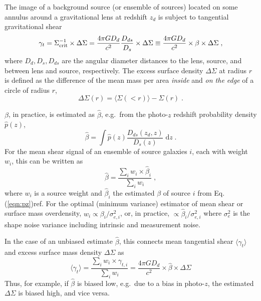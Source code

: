 {The image of a background source (or ensemble of sources) located on some annulus around a gravitational lens at redshift $z_d$ is subject to tangential gravitational shear \citep[e.g.][for a review]{2001PhR...340..291B}
\begin{equation}
\gamma_t=\Sigma_{\rm crit}^{-1}\times\Delta\Sigma=\frac{4\pi G D_{d}}{c^2}\frac{D_{ds}}{D_s}\times\Delta\Sigma\equiv \frac{4\pi G D_{d}}{c^2}\times\beta\times\Delta\Sigma \; ,
\end{equation}
where $D_d, D_s, D_{ds}$ are the angular diameter distances to the lens, source, and between lens and source, respectively. The excess surface density $\Delta\Sigma$ at radius $r$ is defined as the difference of the mean mass per area \emph{inside} and \emph{on the edge} of a circle of radius $r$,
\begin{equation}
\Delta\Sigma(r)=\langle\Sigma(<r)\rangle-\Sigma(r) \; .
\end{equation}

$\beta$, in practice, is estimated as $\hat{\beta}$, e.g.~from the photo-$z$ redshift probability density $\hat{p}(z)$,
\begin{equation}
\hat{\beta}=\int\hat{p}(z) \frac{D_{ds}(z_d,z)}{D_s(z)}\; \mathrm{d}z \; .
\label{eqn:pz}
\end{equation}
For the mean shear signal of an ensemble of source galaxies $i$, each with weight $w_i$, this can be written as
\begin{equation}
\hat{\beta}=\frac{\sum_i w_i\times\hat{\beta}_i}{\sum_i w_i} \; ,
\label{eqn:nz}
\end{equation}
where $w_i$ is a source weight and $\hat{\beta}_i$ the estimated $\beta$ of source $i$ from Eq. (\ref{eqn:pz})ref. For the optimal (minimum variance) estimator of mean shear or surface mass overdensity, $w_i\propto\beta_i/\sigma_{e,i}^2$, or, in practice, $\propto\hat{\beta}_i/\sigma_{e,i}^2$ where $\sigma_{e}^2$ is the shape noise variance including intrinsic and measurement noise.

In the case of an unbiased estimate $\hat{\beta}$, this connects mean tangential shear $\langle\gamma_t\rangle$ and excess surface mass density $\Delta\Sigma$ as
\begin{equation}
\langle\gamma_t\rangle=\frac{\sum_i w_i\times\gamma_{t,i}}{\sum_i w_i}=\frac{4\pi G D_{d}}{c^2}\times\hat{\beta}\times\Delta\Sigma
\end{equation}
Thus, for example, if $\hat{\beta}$ is biased low, e.g.~due to a bias in photo-$z$, the estimated $\Delta\Sigma$ is biased high, and vice versa.

}

